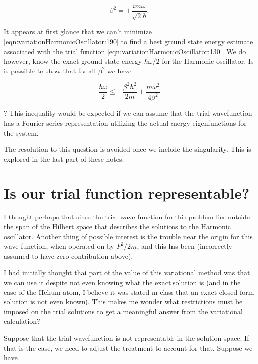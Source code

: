 \begin{equation}\label{eqn:variationHarmonicOscillator:230}
\beta^2 = \pm \frac{i m \omega}{\sqrt{2} \hbar}.
\end{equation}

It appears at first glance that we can't minimize \ref{eqn:variationHarmonicOscillator:190} to find a best ground state energy estimate associated with the trial function \ref{eqn:variationHarmonicOscillator:130}.  We do however, know the exact ground state energy $\hbar \omega/2$ for the Harmonic oscillator.  Is is possible to show that for all $\beta^2$ we have

\begin{equation}\label{eqn:variationHarmonicOscillator:250}
\frac{\hbar \omega}{2} \le -\frac{\beta^2 \hbar^2}{2m} + \frac{m \omega^2}{4 \beta^2}
\end{equation}

?  This inequality would be expected if we can assume that the trial wavefunction has a Fourier series representation utilizing the actual energy eigenfunctions for the system.

The resolution to this question is avoided once we include the singularity.  This is explored in the last part of these notes.

\section{Is our trial function representable?}

I thought perhaps that since the trial wave function for this problem lies outside the span of the Hilbert space that describes the solutions to the Harmonic oscillator.  Another thing of possible interest is the trouble near the origin for this wave function, when operated on by $P^2/2m$, and this has been (incorrectly assumed to have zero contribution above).

I had initially thought that part of the value of this variational method was that we can use it despite not even knowing what the exact solution is (and in the case of the Helium atom, I believe it was stated in class that an exact closed form solution is not even known).  This makes me wonder what restrictions must be imposed on the trial solutions to get a meaningful answer from the variational calculation?

Suppose that the trial wavefunction is not representable in the solution space.  If that is the case, we need to adjust the treatment to account for that.  Suppose we have

